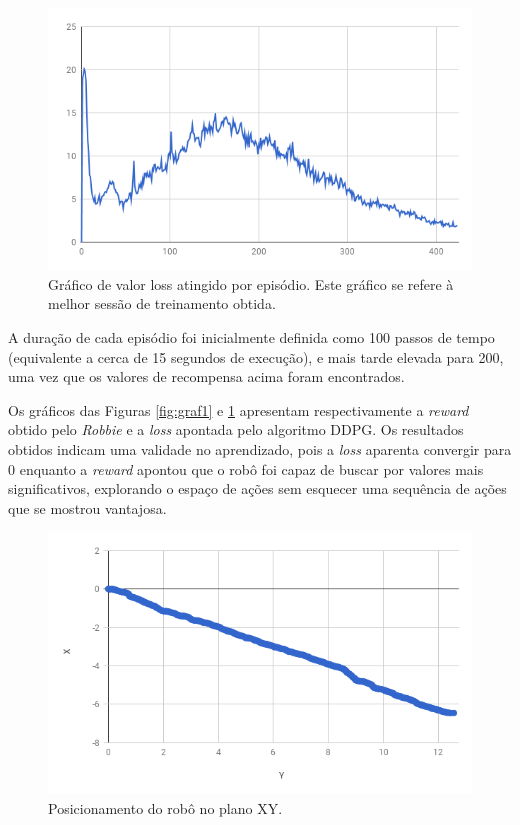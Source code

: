\documentclass[twoside,conference,a4paper]{IEEEtran}
\begin{document}
\begin{figure}[ht!]
  \centering
  \includegraphics[width=1\hsize]{figuras/loss.png}
  \caption{Gráfico de valor loss atingido por episódio. Este gráfico se refere à melhor sessão de treinamento obtida.}
  \label{fig:graf2}
\end{figure}

A duração de cada episódio foi inicialmente definida como 100 passos de tempo (equivalente a cerca de 15 segundos de execução), e mais tarde elevada para 200, uma vez que os valores de recompensa acima foram encontrados.

Os gráficos das Figuras \ref{fig:graf1} e \ref{fig:graf2} apresentam respectivamente a \textit{reward} obtido pelo \textit{Robbie} e a \textit{loss} apontada pelo algoritmo DDPG. Os resultados obtidos indicam uma validade no aprendizado, pois a \textit{loss} aparenta convergir para $0$ enquanto a \textit{reward} apontou que o robô foi capaz de buscar por valores mais significativos, explorando o espaço de ações sem esquecer uma sequência de ações que se mostrou vantajosa. 

\begin{figure}[ht!]
  \centering
  \includegraphics[width=1\hsize]{figuras/position.png}
  \caption{Posicionamento do robô no plano XY.}
  \label{fig:pos}
\end{figure}
\end{document}
